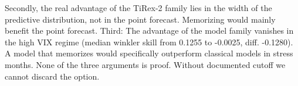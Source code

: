 Secondly, the real advantage of the TiRex-2 family lies in the width of the predictive distribution, not in the point forecast. Memorizing would mainly benefit the point forecast.
Third: The advantage of the model family vanishes in the high VIX regime (median winkler skill from 0.1255 to -0.0025, diff. -0.1280). A model that memorizes would specifically outperform classical models in stress months.
None of the three arguments is proof. Without documented cutoff we cannot discard the option.
